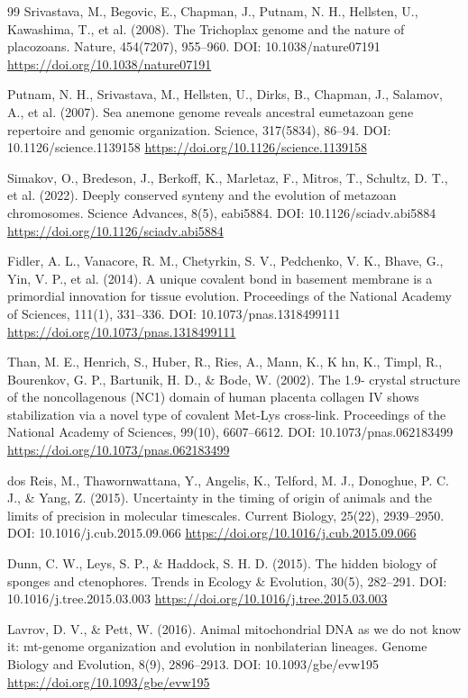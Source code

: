 \documentclass[10pt,letterpaper]{article}
\begin{document}
\begin{thebibliography}{99}
 Srivastava, M., Begovic, E., Chapman, J., Putnam, N. H., Hellsten, U., Kawashima, T., et al. (2008). The Trichoplax genome and the nature of placozoans. Nature, 454(7207), 955--960. DOI: 10.1038/nature07191 \url{https://doi.org/10.1038/nature07191}

 Putnam, N. H., Srivastava, M., Hellsten, U., Dirks, B., Chapman, J., Salamov, A., et al. (2007). Sea anemone genome reveals ancestral eumetazoan gene repertoire and genomic organization. Science, 317(5834), 86--94. DOI: 10.1126/science.1139158 \url{https://doi.org/10.1126/science.1139158}

 Simakov, O., Bredeson, J., Berkoff, K., Marletaz, F., Mitros, T., Schultz, D. T., et al. (2022). Deeply conserved synteny and the evolution of metazoan chromosomes. Science Advances, 8(5), eabi5884. DOI: 10.1126/sciadv.abi5884 \url{https://doi.org/10.1126/sciadv.abi5884}

 Fidler, A. L., Vanacore, R. M., Chetyrkin, S. V., Pedchenko, V. K., Bhave, G., Yin, V. P., et al. (2014). A unique covalent bond in basement membrane is a primordial innovation for tissue evolution. Proceedings of the National Academy of Sciences, 111(1), 331--336. DOI: 10.1073/pnas.1318499111 \url{https://doi.org/10.1073/pnas.1318499111}

 Than, M. E., Henrich, S., Huber, R., Ries, A., Mann, K., K hn, K., Timpl, R., Bourenkov, G. P., Bartunik, H. D., \& Bode, W. (2002). The 1.9-  crystal structure of the noncollagenous (NC1) domain of human placenta collagen IV shows stabilization via a novel type of covalent Met-Lys cross-link. Proceedings of the National Academy of Sciences, 99(10), 6607--6612. DOI: 10.1073/pnas.062183499 \url{https://doi.org/10.1073/pnas.062183499}

 dos Reis, M., Thawornwattana, Y., Angelis, K., Telford, M. J., Donoghue, P. C. J., \& Yang, Z. (2015). Uncertainty in the timing of origin of animals and the limits of precision in molecular timescales. Current Biology, 25(22), 2939--2950. DOI: 10.1016/j.cub.2015.09.066 \url{https://doi.org/10.1016/j.cub.2015.09.066}

 Dunn, C. W., Leys, S. P., \& Haddock, S. H. D. (2015). The hidden biology of sponges and ctenophores. Trends in Ecology \& Evolution, 30(5), 282--291. DOI: 10.1016/j.tree.2015.03.003 \url{https://doi.org/10.1016/j.tree.2015.03.003}

 Lavrov, D. V., \& Pett, W. (2016). Animal mitochondrial DNA as we do not know it: mt-genome organization and evolution in nonbilaterian lineages. Genome Biology and Evolution, 8(9), 2896--2913. DOI: 10.1093/gbe/evw195 \url{https://doi.org/10.1093/gbe/evw195}


\end{thebibliography}
\end{document}

